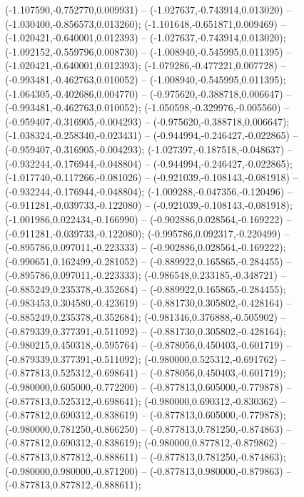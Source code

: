  (-1.107590,-0.752770,0.009931) -- (-1.027637,-0.743914,0.013020) -- (-1.030400,-0.856573,0.013260);
 (-1.101648,-0.651871,0.009469) -- (-1.020421,-0.640001,0.012393) -- (-1.027637,-0.743914,0.013020);
 (-1.092152,-0.559796,0.008730) -- (-1.008940,-0.545995,0.011395) -- (-1.020421,-0.640001,0.012393);
 (-1.079286,-0.477221,0.007728) -- (-0.993481,-0.462763,0.010052) -- (-1.008940,-0.545995,0.011395);
 (-1.064305,-0.402686,0.004770) -- (-0.975620,-0.388718,0.006647) -- (-0.993481,-0.462763,0.010052);
 (-1.050598,-0.329976,-0.005560) -- (-0.959407,-0.316905,-0.004293) -- (-0.975620,-0.388718,0.006647);
 (-1.038324,-0.258340,-0.023431) -- (-0.944994,-0.246427,-0.022865) -- (-0.959407,-0.316905,-0.004293);
 (-1.027397,-0.187518,-0.048637) -- (-0.932244,-0.176944,-0.048804) -- (-0.944994,-0.246427,-0.022865);
 (-1.017740,-0.117266,-0.081026) -- (-0.921039,-0.108143,-0.081918) -- (-0.932244,-0.176944,-0.048804);
 (-1.009288,-0.047356,-0.120496) -- (-0.911281,-0.039733,-0.122080) -- (-0.921039,-0.108143,-0.081918);
 (-1.001986,0.022434,-0.166990) -- (-0.902886,0.028564,-0.169222) -- (-0.911281,-0.039733,-0.122080);
 (-0.995786,0.092317,-0.220499) -- (-0.895786,0.097011,-0.223333) -- (-0.902886,0.028564,-0.169222);
 (-0.990651,0.162499,-0.281052) -- (-0.889922,0.165865,-0.284455) -- (-0.895786,0.097011,-0.223333);
 (-0.986548,0.233185,-0.348721) -- (-0.885249,0.235378,-0.352684) -- (-0.889922,0.165865,-0.284455);
 (-0.983453,0.304580,-0.423619) -- (-0.881730,0.305802,-0.428164) -- (-0.885249,0.235378,-0.352684);
 (-0.981346,0.376888,-0.505902) -- (-0.879339,0.377391,-0.511092) -- (-0.881730,0.305802,-0.428164);
 (-0.980215,0.450318,-0.595764) -- (-0.878056,0.450403,-0.601719) -- (-0.879339,0.377391,-0.511092);
 (-0.980000,0.525312,-0.691762) -- (-0.877813,0.525312,-0.698641) -- (-0.878056,0.450403,-0.601719);
 (-0.980000,0.605000,-0.772200) -- (-0.877813,0.605000,-0.779878) -- (-0.877813,0.525312,-0.698641);
 (-0.980000,0.690312,-0.830362) -- (-0.877812,0.690312,-0.838619) -- (-0.877813,0.605000,-0.779878);
 (-0.980000,0.781250,-0.866250) -- (-0.877813,0.781250,-0.874863) -- (-0.877812,0.690312,-0.838619);
 (-0.980000,0.877812,-0.879862) -- (-0.877813,0.877812,-0.888611) -- (-0.877813,0.781250,-0.874863);
 (-0.980000,0.980000,-0.871200) -- (-0.877813,0.980000,-0.879863) -- (-0.877813,0.877812,-0.888611);
